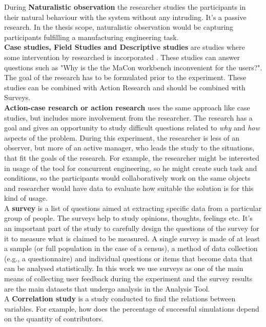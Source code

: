 During \textbf{Naturalistic observation} the researcher studies the participants in their natural behaviour with the system without any intruding. It's a passive research. In the thesis scope, naturalistic observation would be capturing participants fulfilling a manufacturing engineering task.\\

\textbf{Case studies, Field Studies and Descriptive studies} are studies where some intervention by researched is incorporated \cite{leroy}. These studies can answer questions such as "Why is the the MaCon workbench inconvenient for the users?". The goal of the research has to be formulated prior to the experiment. These studies can be combined with Action Research and should be combined with Surveys.\\

\textbf{Action-case research or action research} uses the same approach like case studies, but includes more involvement from the researcher. The research has a goal and gives an opportunity to study difficult questions related to \textit{why} and \textit{how} aspects of the problem. During this experiment, the researcher is less of an observer, but more of an active manager, who leads the study to the situations, that fit the goals of the research. For example, the researcher might be interested in usage of the tool for concurrent engineering, so he might create such task and conditions, so the participants would collaboratively work on the same objects and researcher would have data to evaluate how suitable the solution is for this kind of usage.\\

A \textbf{survey} is a list of questions aimed at extracting specific data from a particular group of people. The surveys help to study opinions, thoughts, feelings etc. It's an important part of the study to carefully design the questions of the survey for it to measure what is claimed to be measured.
A single survey is made of at least a sample (or full population in the case of a census), a method of data collection (e.g., a questionnaire) and individual questions or items that become data that can be analysed statistically. In this work we use surveys as one of the main means of collecting user feedback during the experiment and the survey results are the main datasets that undergo analysis in the Analysis Tool.\\  

A \textbf{Correlation study} is a study conducted to find the relations between variables. For example, how does the percentage of successful simulations depend on the quantity of contributors. \\


